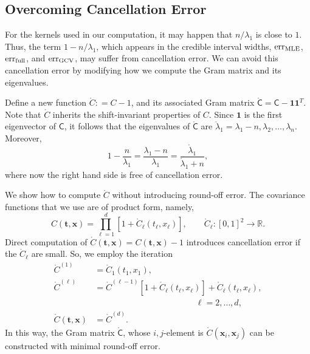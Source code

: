 \documentclass[twocolumn]{svjour3}          %
\newcommand{\bm}[1]{\boldsymbol{#1}}
\newcommand{\reals}{\mathbb{R}}
\newcommand{\rC}{\mathring{C}}
\newcommand{\rlambda}{\mathring{\lambda}}
\newcommand{\vt}{\bm{t}}
\newcommand{\vx}{\bm{x}}
\newcommand{\vone}{\bm{1}}
\newcommand{\mC}{\mathsf{C}}
\newcommand{\rmC}{\mathring{\mathsf{C}}}
\newcommand{\MLE}{\textup{MLE}}
\newcommand{\err}{\textup{err}}
\begin{document}
\subsection{Overcoming Cancellation Error}
For the kernels used in our computation, it may happen that $n/\lambda_1$ is close to $1$.  Thus, the term $1-n/\lambda_1$, which appears in the credible interval widths, $\err_{\MLE}$, $\err_{\textup{full}}$, and $\err_{\textup{GCV}}$, may suffer from cancellation error.  We can avoid this cancellation error by modifying how we compute the Gram matrix and its eigenvalues.

Define a new function $\rC : = C -1$, and its associated Gram matrix $\rmC = \mC - \vone \vone^T$.   Note that $\rC$ inherits the shift-invariant properties of $C$.  Since $\vone$ is the first eigenvector of $\mC$, it follows that the eigenvalues of $\rmC$ are $\rlambda_1 = \lambda_1 - n, \lambda_2, \ldots, \lambda_n$.  Moreover,
\begin{equation*}
1 - \frac{n}{\lambda_1}  = \frac{\lambda_1 - n}{\lambda_1} = \frac{\rlambda_1}{\rlambda_1 +n},
\end{equation*}
where now the right hand side is free of cancellation error.

We show how to compute $\rC$ without introducing round-off error.  The covariance functions that we use are of product form, namely,
\begin{equation*}
C(\vt, \vx) = \prod_{\ell=1}^d \left[1 + \rC_\ell(t_\ell,x_\ell) \right], \qquad  \rC_\ell:[0,1]^2 \to \reals.
\end{equation*}
Direct computation of $\rC (\vt,\vx) = C(\vt,\vx) -1$ introduces cancellation error if the $ \rC_\ell$ are small.  So, we employ the iteration
\begin{align*}
\rC^{(1)} &= \rC_1(t_1,x_1),  \\
\rC^{(\ell)} &  = \rC^{(\ell-1)}[1 + \rC_\ell(t_\ell,x_\ell)] + \rC_\ell(t_\ell,x_\ell), \\
& \hspace{5cm} \ell = 2, \ldots, d, \\
\rC(\vt,\vx)  & = \rC^{(d)}.
\end{align*}
In this way, the Gram matrix $\rmC$, whose $i,j$-element is $\rC(\vx_i,\vx_j)$ can be constructed with minimal round-off error.
\end{document}
